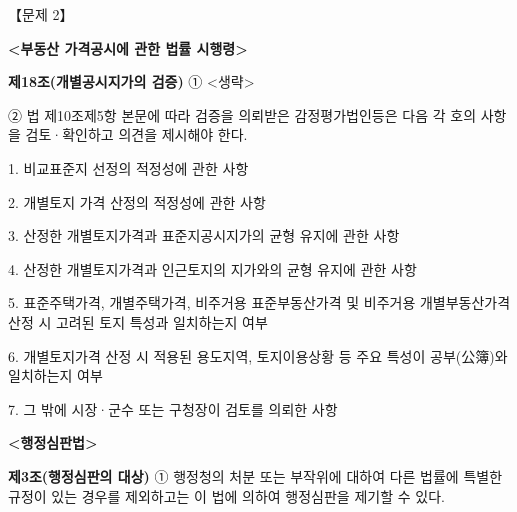\begin{longquestion}{【문제 2】}
\begin{framedtext}
\textbf{<부동산 가격공시에 관한 법률 시행령>} \par
\textbf{제18조(개별공시지가의 검증)} ① <생략> \par
② 법 제10조제5항 본문에 따라 검증을 의뢰받은 감정평가법인등은 다음 각 호의 사항을 검토·확인하고 의견을 제시해야 한다. \par
\hspace*{1em}1. 비교표준지 선정의 적정성에 관한 사항 \par
\hspace*{1em}2. 개별토지 가격 산정의 적정성에 관한 사항 \par
\hspace*{1em}3. 산정한 개별토지가격과 표준지공시지가의 균형 유지에 관한 사항 \par
\hspace*{1em}4. 산정한 개별토지가격과 인근토지의 지가와의 균형 유지에 관한 사항 \par
\hspace*{1em}5. 표준주택가격, 개별주택가격, 비주거용 표준부동산가격 및 비주거용 개별부동산가격 산정 시 고려된 토지 특성과 일치하는지 여부 \par
\hspace*{1em}6. 개별토지가격 산정 시 적용된 용도지역, 토지이용상황 등 주요 특성이 공부(公簿)와 일치하는지 여부 \par
\hspace*{1em}7. 그 밖에 시장·군수 또는 구청장이 검토를 의뢰한 사항 \par
\textbf{<행정심판법>} \par
\textbf{제3조(행정심판의 대상)} ① 행정청의 처분 또는 부작위에 대하여 다른 법률에 특별한 규정이 있는 경우를 제외하고는 이 법에 의하여 행정심판을 제기할 수 있다. \par
\end{framedtext}
\end{longquestion}
